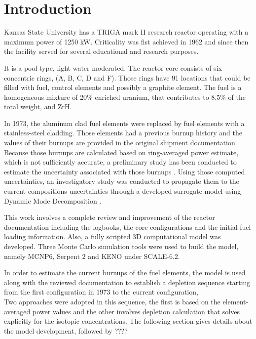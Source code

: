 \documentclass[review,number,sort&compress,12pt]{elsarticle}
\begin{document}
\linenumbers

\section{Introduction}
Kansas State University has a TRIGA mark II research reactor operating with a maximum power of 1250 kW. Criticality was fist achieved in 1962 and since then the facility served for several educational and research purposes.

It is a pool type, light water moderated. The reactor core consists of six concentric rings, (A, B, C, D and F). Those rings have 91 locations that could be filled with fuel, control elements and possibly a graphite element.
The fuel is a homogeneous mixture of 20\% enriched uranium, that contributes to 8.5\% of the total weight, and ZrH.

In 1973, the aluminum clad fuel elements  were replaced by fuel elements with a stainless-steel cladding. Those elements had a previous burnup history and the values of their burnups are provided in the original shipment documentation. 
Because those burnups are calculated based on ring-averaged power estimate, which is not sufficiently accurate, a preliminary study has been conducted to estimate the uncertainty associated with those burnups \cite{gairola2017estimating}. Using those computed uncertainties, an investigatory study was conducted to propagate them to the current compositions uncertainties through a developed surrogate model using Dynamic Mode Decomposition \cite{recent paper}.

This work involves a complete review and improvement of the reactor documentation including the logbooks, the core configurations and the initial fuel loading information.
Also, a fully scripted 3D computational model was developed. Three Monte Carlo simulation tools were used to build the model, namely MCNP6, Serpent 2 and KENO under SCALE-6.2.

In order to estimate the current burnups of the fuel elements, the model is used along with the reviewed documentation to establish a depletion sequence starting from the first configuration in 1973 to the current configuration,  \\
Two approaches were adopted in this sequence, the first is based on the element-averaged power values and the other involves depletion calculation that solves explicitly for the isotopic concentrations.
The following section gives details about the model development, followed by ????
\end{document}
